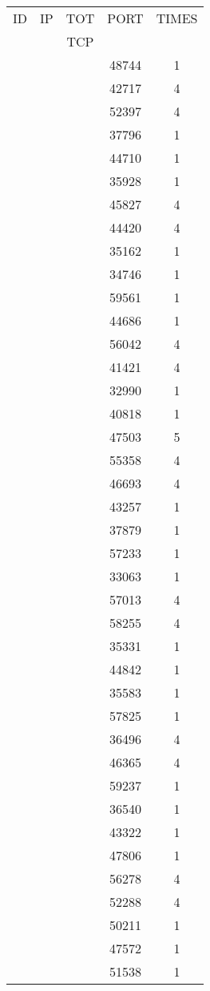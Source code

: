 \documentclass[a4paper]{scrartcl}
\begin{document}
\begin{minipage}[b]{0.5\linewidth}
\begin{tabular}{| c | c | c | c | c |}
\hline
ID & IP & TOT & PORT & TIMES \\ 
   &    & TCP &      &       \\ 
\hline
& & & 48744 & 1 \\ & & & 42717 & 4 \\ & & & 52397 & 4 \\ & & & 37796 & 1 \\ & & & 44710 & 1 \\ & & & 35928 & 1 \\ & & & 45827 & 4 \\ & & & 44420 & 4 \\ & & & 35162 & 1 \\ & & & 34746 & 1 \\ & & & 59561 & 1 \\ & & & 44686 & 1 \\ & & & 56042 & 4 \\ & & & 41421 & 4 \\ & & & 32990 & 1 \\ & & & 40818 & 1 \\ & & & 47503 & 5 \\ & & & 55358 & 4 \\ & & & 46693 & 4 \\ & & & 43257 & 1 \\ & & & 37879 & 1 \\ & & & 57233 & 1 \\ & & & 33063 & 1 \\ & & & 57013 & 4 \\ & & & 58255 & 4 \\ & & & 35331 & 1 \\ & & & 44842 & 1 \\ & & & 35583 & 1 \\ & & & 57825 & 1 \\ & & & 36496 & 4 \\ & & & 46365 & 4 \\ & & & 59237 & 1 \\ & & & 36540 & 1 \\ & & & 43322 & 1 \\ & & & 47806 & 1 \\ & & & 56278 & 4 \\ & & & 52288 & 4 \\ & & & 50211 & 1 \\ & & & 47572 & 1 \\ & & & 51538 & 1 \\ \hline\end{tabular}\end{minipage} \hfill\begin{minipage}[b]{0.5\linewidth}\begin{tabular}{| c | c | c | c | c |}

\end{tabular}
\end{minipage}
\end{document}
